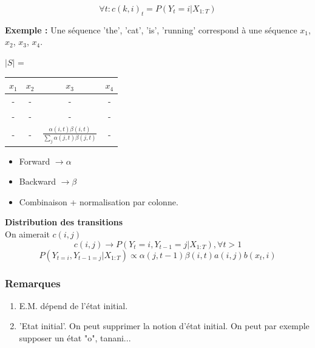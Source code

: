 \documentclass{article}
\begin{document}
$$ \forall t : c(k, i)_t = P(Y_t = i | X_{1:T}) $$

\textbf{Exemple : } Une séquence 'the', 'cat', 'is', 'running' correspond à une séquence $x_1$, $x_2$, $x_3$, $x_4$.

$|S|$ = 
\begin{tabular}{|c|c|c|c|}
\hline
$x_1$ & $x_2$ & $x_3$ & $x_4$ \\
\hline
- & - & - & - \\
- & - & - & - \\
- & - & $\frac{\alpha(i, t) \beta(i, t)}{\sum_j \alpha(j, t) \beta(j, t)}$ & - \\ 
\hline
\end{tabular}

\begin{itemize}
\item Forward $\rightarrow \alpha$
\item Backward $\rightarrow \beta$
\item Combinaison + normalisation par colonne.
\end{itemize}

\textbf{Distribution des transitions}
\\
On aimerait $c(i, j)$
$$ c(i, j) \rightarrow P(Y_t = i, Y_{t-1} = j | X_{1:T}), \forall t > 1 $$
$$ P(Y_{t=i}, Y_{t-1=j} | X_{1:T}) \propto \alpha(j, t-1) \beta(i, t) a(i, j) b(x_t, i) $$

\subsubsection{Remarques}
\begin{enumerate}
\item E.M. dépend de l'état initial.
\item 'Etat initial'. On peut supprimer la notion d'état initial. On peut par exemple supposer un état "o", tanani...
\end{enumerate}
\end{document}
